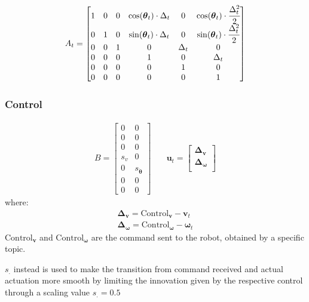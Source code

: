 \noindent
\begin{equation}
A_t
=
\begin{bmatrix}
1 & 0 & 0 & \cos(\boldsymbol \theta_t) \cdot \Delta_t & 0 & \cos(\boldsymbol \theta_t) \cdot  \cfrac{\Delta_t^2 }{2} \\
0 & 1 & 0 & \sin(\boldsymbol \theta_t) \cdot \Delta_t & 0 & \sin(\boldsymbol \theta_t) \cdot  \cfrac{\Delta_t^2 }{2} \\
0 & 0 & 1 & 0 & \Delta_t & 0 \\
0 & 0 & 0 & 1 & 0 & \Delta_t \\
0 & 0 & 0 & 0 & 1 & 0 \\
0 & 0 & 0 & 0 & 0 & 1
\end{bmatrix}
\end{equation}


\subsubsection{Control}

\noindent
\begin{align}
B
=
    \begin{bmatrix}
    0 & 0 \\
    0 & 0\\
    0 & 0\\
    s_v & 0\\
    0 & s_{ \dot{\boldsymbol \theta}}\\
    0 & 0\\
    0 & 0
    \end{bmatrix}
& \quad
\mathbf{u}_t
=
    \begin{bmatrix}
    \boldsymbol \Delta_{\mathbf{v}}  \\
    \boldsymbol \Delta_{ \boldsymbol \omega} \\[0.3em]
    \end{bmatrix}
\end{align}
where:
  \begin{align}
     \boldsymbol \Delta_{\mathbf{v}} = \text{Control}_{\mathbf{v}} - \mathbf{v}_t  \\
    \boldsymbol \Delta_{\boldsymbol \omega} = \text{Control}_{\boldsymbol \omega} - \boldsymbol \omega_t
  \end{align}
$ \text{Control}_{\mathbf{v}}$ and  $\text{Control}_{\boldsymbol \omega}$ are the command sent to the robot, obtained by a specific topic.

$s_{.}$ instead is used to make the transition from command received and actual actuation more smooth by limiting the innovation given by the respective control through a scaling value $s_. = 0.5$


